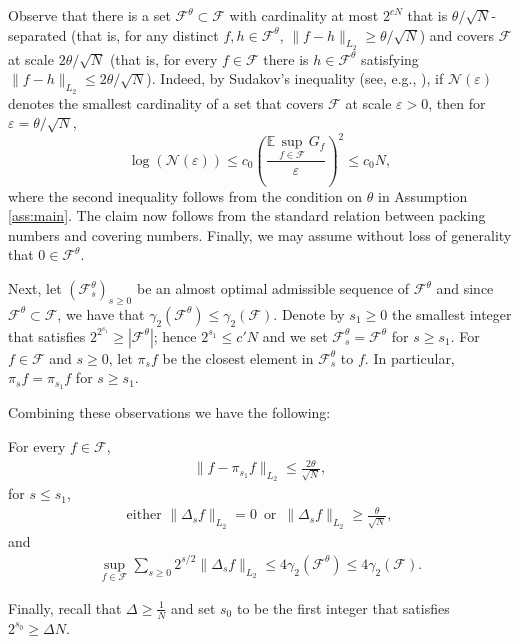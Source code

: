 \documentclass[11pt]{amsart}
\theoremstyle{definition}
\newcommand{\E}{\mathbb{E}}
\numberwithin{equation}{section}
\begin{document}
Observe that there is a set $\mathcal{F}^{\theta}\subset \mathcal{F}$ with cardinality at most $2^{c N}$ that is  $\theta/\sqrt{N}$-separated (that is, for any  distinct $f,h\in\mathcal{F}^{\theta}$, $\|f-h\|_{L_{2}}\geq \theta/\sqrt N$) and covers $\mathcal{F}$ at scale $2\theta/\sqrt N$ (that is, for every $f\in\mathcal{F}$ there is $h\in\mathcal{F}^\theta$ satisfying $\|f-h\|_{L_2}\leq 2\theta/\sqrt N$).
Indeed, by Sudakov's inequality (see, e.g., \cite[Theorem 5.6]{pisier1999volume}),  if $\mathcal{N}(\varepsilon)$ denotes the smallest cardinality of a set that covers $\mathcal{F}$ at scale $\varepsilon>0$,  then for $\varepsilon = \theta /  \sqrt N $,
\[  \log \left( \mathcal{N} \left( \varepsilon\right)\right)
\leq c_0 \left( \frac{ \E  \sup_{f\in\mathcal{F}} G_f }{\varepsilon} \right)^2 
\leq c_0 N, \]
where the second inequality follows from the condition on $\theta$ in Assumption \ref{ass:main}.
The claim now follows from the standard relation  between packing numbers and covering numbers.
Finally, we may  assume without loss of generality that $0\in\mathcal{F}^\theta$.


Next, let $(\mathcal{F}^{\theta}_{s})_{s\geq 0}$ be an almost optimal admissible sequence of $\mathcal{F}^{\theta}$ and since $\mathcal{F}^{\theta}\subset\mathcal{F}$, we have  that $\gamma_{2}(\mathcal{F}^{\theta})\leq \gamma_{2}(\mathcal{F})$.
Denote by  $s_{1}\geq 0$ the smallest integer that satisfies $2^{2^{s_{1}}} \geq |\mathcal{F}^{\theta}|$; hence $2^{s_{1} }\leq c' N$ and we set $\mathcal{F}^{\theta}_{s}= \mathcal{F}^{\theta}$ for $s\geq s_1$.
For $f\in\mathcal{F}$ and $s\geq 0$,  let $\pi_{s}f $ be the closest element in $\mathcal{F}^{\theta}_{s}$ to $f$. 
In particular, $\pi_s f = \pi_{s_1}f$ for $s\geq s_1$.

Combining these observations we have the following:
\begin{tcolorbox}
For every $f\in\mathcal{F}$, 
\begin{align}
\label{eq:end.of.chain}
\|f-\pi_{s_{1}}f\|_{L_{2}}\leq  \frac{2\theta}{\sqrt N},
\end{align}
 for $ s\leq s_{1}$, 
\begin{align}
\label{eq:middle.of.chain}
\text{either  } \|\Delta_{s }f \|_{L_{2}}=0 \, \text{ or }   \,\|\Delta_{s }f \|_{L_{2}}\geq  \frac{\theta}{\sqrt N},
\end{align}
and 
\begin{align}
\label{eq:almost.optioma.admissible.seq}
 \sup_{f\in\mathcal{F}} \sum_{s\geq 0} 2^{s/2} \| \Delta_{s} f \|_{L_{2}}
\leq 4 \gamma_{2}(\mathcal{F}^{\theta})
\leq 4 \gamma_{2}(\mathcal{F}).
\end{align}
\end{tcolorbox}
Finally, recall that $\Delta\geq \frac{1}{N}$ and set  $s_{0}$ to be the first integer that satisfies $2^{s_{0}}\geq \Delta N$.
\end{document}
